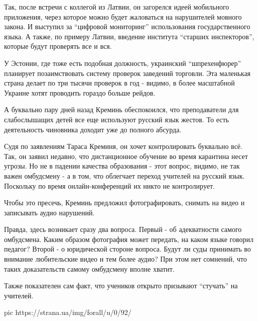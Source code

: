 Так, после встречи с коллегой из Латвии, он загорелся идеей мобильного
приложения, через которое можно будет жаловаться на нарушителей мовного закона.
И выступил за \enquote{цифровой мониторинг} использования государственного языка. А
также, по примеру Латвии, введение института \enquote{старших инспекторов}, которые
будут проверять все и вся. 

У Эстонии, где тоже есть подобная должность, украинский \enquote{шпрехенфюрер}
планирует позаимствовать систему проверок заведений торговли. Эта маленькая
страна делает по три тысячи проверок в год - видимо, в более масштабной Украине
хотят проводить гораздо больше рейдов. 

А буквально пару дней назад Креминь обеспокоился, что преподаватели для
слабослышащих детей все еще используют русский язык жестов. То есть
деятельность чиновника доходит уже до полного абсурда. 

Судя по заявлениям Тараса Креминя, он хочет контролировать буквально всё. Так,
он заявил недавно, что дистанционное обучение во время карантина несет угрозы.
Но не в падении качества образования - этот вопрос, видимо, не так важен
омбудсмену - а в том, что облегчает переход учителей на русский язык. Поскольку
по время онлайн-конференций их никто не контролирует.

Чтобы это пресечь, Креминь предложил фотографировать, снимать на видео и
записывать аудио нарушений.

Правда, здесь возникает сразу два вопроса. Первый - об адекватности самого
омбудсмена. Каким образом фотография может передать, на каком языке говорил
педагог? Второй - о юридической стороне вопроса. Будут ли суды принимать во
внимание любительские видео и тем более аудио? При этом нет сомнений, что таких
доказательств самому омбудсмену вполне хватит.

Также показателен сам факт, что учеников открыто призывают \enquote{стучать} на
учителей. 

\ifcmt
pic https://strana.ua/img/forall/u/0/92/%
\fi
